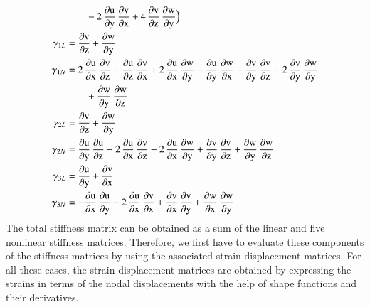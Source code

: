 \begin{subequations}
\begin{align}
	\mbox{} & \qquad - 2 \, \mathrm{\frac{\partial u}{\partial y}}\, \mathrm{\frac{\partial v}{\partial x}} + 4 \, \mathrm{\frac{\partial v}{\partial z}}\, \mathrm{\frac{\partial w}{\partial y}}\Big)\\
	\mathrm \gamma_{1L} & = \mathrm{\frac{\partial v}{\partial z}} + \mathrm{\frac{\partial w}{\partial y}}\\
	\mathrm \gamma_{1N} & = 2 \, \mathrm{\frac{\partial u}{\partial x}}\, \mathrm{\frac{\partial v}{\partial z}} - \mathrm{\frac{ \partial u}{\partial z}}\, \mathrm{\frac{ \partial v}{\partial x}} + 2 \, \mathrm{\frac{\partial u}{\partial x}}\, \mathrm{\frac{\partial w}{\partial y}} - \mathrm{\frac{\partial u}{\partial y}}\, \mathrm{\frac{\partial w}{\partial x}} - \mathrm{\frac{\partial v}{\partial y}}\, \mathrm{\frac{\partial v}{\partial z}}  - 2 \, \mathrm{\frac{\partial v}{\partial y}}\, \mathrm{\frac{\partial w}{\partial y}} \notag \\
	\mbox{} & \qquad + \mathrm{\frac{\partial w}{\partial y}}\, \mathrm{\frac{\partial w}{\partial z}}\\
	\mathrm \gamma_{2L} & = \mathrm{\frac{\partial v}{\partial z}} + \mathrm{\frac{\partial w}{\partial y}}\\
	\mathrm \gamma_{2N} & = \mathrm{\frac{\partial u}{\partial y}}\, \mathrm{\frac{\partial u}{\partial z}} - 2 \, \mathrm{\frac{ \partial u}{\partial x}}\, \mathrm{\frac{ \partial v}{\partial z}} - 2 \, \mathrm{\frac{\partial u}{\partial x}}\, \mathrm{\frac{\partial w}{\partial y}} + \mathrm{\frac{\partial v}{\partial y}}\, \mathrm{\frac{\partial v}{\partial z}} + \mathrm{\frac{\partial w}{\partial y}}\, \mathrm{\frac{\partial w}{\partial z}}\\
	\mathrm \gamma_{3L} & = \mathrm{\frac{\partial u}{\partial y}} + \mathrm{\frac{\partial v}{\partial x}}\\
	\mathrm \gamma_{3N} & = - \mathrm{\frac{\partial u}{\partial x}}\, \mathrm{\frac{\partial u}{\partial y}} - 2 \, \mathrm{\frac{ \partial u}{\partial x}}\, \mathrm{\frac{ \partial v}{\partial x}} + \mathrm{\frac{\partial v}{\partial x}}\, \mathrm{\frac{\partial v}{\partial y}} + \mathrm{\frac{\partial w}{\partial x}}\, \mathrm{\frac{\partial w}{\partial y}} 
	\end{align}
\end{subequations}
The total stiffness matrix can be obtained as a sum of the linear and five nonlinear stiffness matrices. Therefore, we first have to evaluate these components of the stiffness matrices by using the associated strain-displacement matrices. For all these cases, the strain-displacement matrices are obtained by expressing the strains in terms of the nodal displacements with the help of shape functions and their derivatives.

